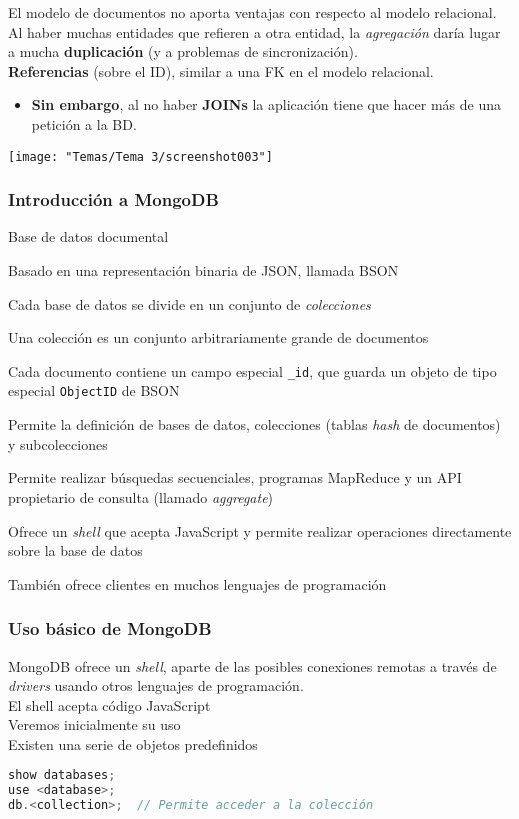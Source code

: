 El modelo de documentos no aporta ventajas con respecto al modelo relacional.\\
Al haber muchas entidades que refieren a otra entidad, la \textit{agregación} daría lugar a mucha \textbf{duplicación} (y a problemas de sincronización).\\
\textbf{Referencias} (sobre el ID), similar a una FK en el modelo relacional.
\begin{itemize}
	\item \textbf{Sin embargo}, al no haber \textbf{JOINs} la aplicación tiene que hacer más de una petición a la BD.
\end{itemize}
\begin{center}
	\texttt{[image: "Temas/Tema 3/screenshot003"]}
\end{center}
\subsubsection{Introducción a MongoDB}
Base de datos documental

Basado en una representación binaria de JSON, llamada BSON

Cada base de datos se divide en un conjunto de \textit{colecciones}

Una colección es un conjunto arbitrariamente grande de documentos

Cada documento contiene un campo especial \texttt{_id}, que guarda un objeto de tipo especial \texttt{ObjectID} de BSON

Permite la definición de bases de datos, colecciones (tablas \textit{hash} de documentos) y subcolecciones

Permite realizar búsquedas secuenciales, programas MapReduce y un API propietario de consulta (llamado \textit{aggregate})

Ofrece un \textit{shell} que acepta JavaScript y permite realizar operaciones directamente sobre la base de datos

También ofrece clientes en muchos lenguajes de programación
\subsubsection{Uso básico de MongoDB}
MongoDB ofrece un \textit{shell}, aparte de las posibles conexiones remotas a través de \textit{drivers} usando otros lenguajes de programación.\\
El shell acepta código JavaScript\\
Veremos inicialmente su uso\\
Existen una serie de objetos predefinidos\\
\begin{lstlisting}[language=JavaScript]
show databases;
use <database>;
db.<collection>;  // Permite acceder a la colección
\end{lstlisting}

